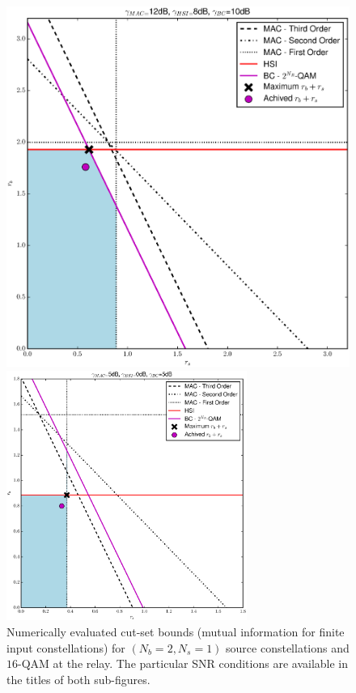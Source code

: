 \documentclass{article}
\begin{document}
\begin{figure}
\begin{centering}
\hspace*{-1.5em}\includegraphics[width=0.7\columnwidth]{fig/Rate_Regions_XOR_map_BC10_MAC12_HSI8}
\par\end{centering}

\begin{centering}
\includegraphics[width=0.7\textwidth]{fig/Rate_Regions_XOR_map_BC5_MAC5_HSI0}
\par\end{centering}

\caption{Numerically evaluated cut-set bounds (mutual information for finite
input constellations) for $(N_{b}=2,N_{s}=1)$ source constellations
and $16$-QAM at the relay. The particular SNR conditions are available
in the titles of both sub-figures.\label{fig:CTUpp_CSB_eval}}
\end{figure}
\end{document}
